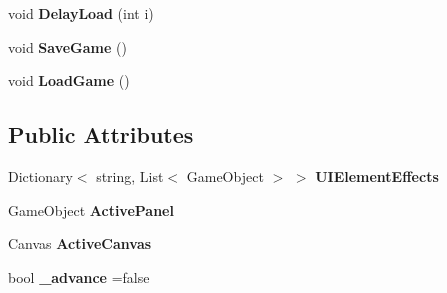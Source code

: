 \begin{DoxyCompactItemize}
\item 
void {\bfseries Delay\+Load} (int i)\hypertarget{classAssets_1_1GameController_a3525988c10924b0674fe8abfe4362f0d}{}\label{classAssets_1_1GameController_a3525988c10924b0674fe8abfe4362f0d}

\item 
void {\bfseries Save\+Game} ()\hypertarget{classAssets_1_1GameController_a9792eadafd175f5371d660d25eb742e1}{}\label{classAssets_1_1GameController_a9792eadafd175f5371d660d25eb742e1}

\item 
void {\bfseries Load\+Game} ()\hypertarget{classAssets_1_1GameController_afb24a20579efe8ad687b34b6f431aa77}{}\label{classAssets_1_1GameController_afb24a20579efe8ad687b34b6f431aa77}

\end{DoxyCompactItemize}
\subsection*{Public Attributes}
\begin{DoxyCompactItemize}
\item 
Dictionary$<$ string, List$<$ Game\+Object $>$ $>$ {\bfseries U\+I\+Element\+Effects}\hypertarget{classAssets_1_1GameController_a67d871137157a85e85a919a56069bcf8}{}\label{classAssets_1_1GameController_a67d871137157a85e85a919a56069bcf8}

\item 
Game\+Object {\bfseries Active\+Panel}\hypertarget{classAssets_1_1GameController_a1584ae7ce76a80b1763d4a65319eb050}{}\label{classAssets_1_1GameController_a1584ae7ce76a80b1763d4a65319eb050}

\item 
Canvas {\bfseries Active\+Canvas}\hypertarget{classAssets_1_1GameController_afc00153c8f2d33bbb9de6867c39ac14f}{}\label{classAssets_1_1GameController_afc00153c8f2d33bbb9de6867c39ac14f}

\item 
bool {\bfseries \+\_\+advance} =false\hypertarget{classAssets_1_1GameController_a6bf03c848865f540968d64dd8a92ba51}{}\label{classAssets_1_1GameController_a6bf03c848865f540968d64dd8a92ba51}

\end{DoxyCompactItemize}
